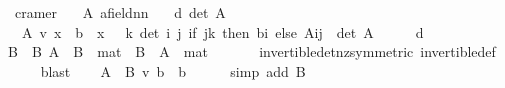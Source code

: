 \begin{isabellebody}
\isanewline
{}\isamarkupfalse%
\ \ cramer{\isacharcolon}{\kern0pt}\isanewline
\ \ \ A\ {\isacharcolon}{\kern0pt}{\isacharcolon}{\kern0pt}{\isachardoublequoteopen}{\isacharprime}{\kern0pt}a{\isacharcolon}{\kern0pt}{\isacharcolon}{\kern0pt}{\isacharbraceleft}{\kern0pt}field{\isacharbraceright}{\kern0pt}{\isacharcircum}{\kern0pt}{\isacharprime}{\kern0pt}n{\isacharcircum}{\kern0pt}{\isacharprime}{\kern0pt}n{\isachardoublequoteclose}\isanewline
\ \ \ d{}{\isacharcolon}{\kern0pt}\ {\isachardoublequoteopen}det\ A\ {\isasymnoteq}\ {}{\isachardoublequoteclose}\isanewline
\ \ \ {\isachardoublequoteopen}A\ {\isacharasterisk}{\kern0pt}v\ x\ {\isacharequal}{\kern0pt}\ b\ {\isasymlongleftrightarrow}\ x\ {\isacharequal}{\kern0pt}\ {\isacharparenleft}{\kern0pt}{\isasymchi}\ k{\isachardot}{\kern0pt}\ det{\isacharparenleft}{\kern0pt}{\isasymchi}\ i\ j{\isachardot}{\kern0pt}\ if\ j{\isacharequal}{\kern0pt}k\ then\ b{\isachardollar}{\kern0pt}i\ else\ A{\isachardollar}{\kern0pt}i{\isachardollar}{\kern0pt}j{\isacharparenright}{\kern0pt}\ {\isacharslash}{\kern0pt}\ det\ A{\isacharparenright}{\kern0pt}{\isachardoublequoteclose}\isanewline
%
\isadelimproof
%
\endisadelimproof
%
\isatagproof
{}\isamarkupfalse%
\ {\isacharminus}{\kern0pt}\isanewline
\ \ \isamarkupfalse%
\ d{}\ \isamarkupfalse%
\ B\ \ B{\isacharcolon}{\kern0pt}\ {\isachardoublequoteopen}A\ {\isacharasterisk}{\kern0pt}{\isacharasterisk}{\kern0pt}\ B\ {\isacharequal}{\kern0pt}\ mat\ {}{\isachardoublequoteclose}\ {\isachardoublequoteopen}B\ {\isacharasterisk}{\kern0pt}{\isacharasterisk}{\kern0pt}\ A\ {\isacharequal}{\kern0pt}\ mat\ {}{\isachardoublequoteclose}\isanewline
\ \ \ \ \isamarkupfalse%
\ invertible{\isacharunderscore}{\kern0pt}det{\isacharunderscore}{\kern0pt}nz{\isacharbrackleft}{\kern0pt}symmetric{\isacharbrackright}{\kern0pt}\ invertible{\isacharunderscore}{\kern0pt}def\isanewline
\ \ \ \ \isamarkupfalse%
\ blast\isanewline
\ \ \isamarkupfalse%
\ {\isachardoublequoteopen}{\isacharparenleft}{\kern0pt}A\ {\isacharasterisk}{\kern0pt}{\isacharasterisk}{\kern0pt}\ B{\isacharparenright}{\kern0pt}\ {\isacharasterisk}{\kern0pt}v\ b\ {\isacharequal}{\kern0pt}\ b{\isachardoublequoteclose}\isanewline
\ \ \ \ \isamarkupfalse%
\ {\isacharparenleft}{\kern0pt}simp\ add{\isacharcolon}{\kern0pt}\ B{\isacharparenright}{\kern0pt}\isanewline
\ \ \isamarkupfalse%

\end{isabellebody}

